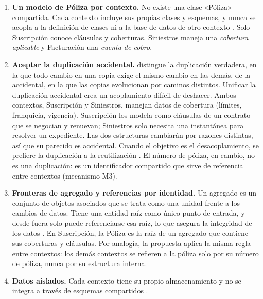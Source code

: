 \begin{enumerate}[label=\textbf{M\arabic*.}, leftmargin=2.2em]
  \item \textbf{Un modelo de Póliza por contexto.} No existe una clase «Póliza»
        compartida. Cada contexto incluye sus propias clases y esquemas, y nunca se acopla
        a la definición de clases ni a la base de datos de otro contexto
        \parencite[cap.~17]{richardsford2020}. Solo Suscripción conoce cláusulas y
        coberturas. Siniestros maneja una \emph{cobertura aplicable} y Facturación una
        \emph{cuenta de cobro}.

  \item \textbf{Aceptar la duplicación accidental.} \textcite[154--155]{martin2017}
        distingue la duplicación verdadera, en la que todo cambio en una copia exige el
        mismo cambio en las demás, de la accidental, en la que las copias evolucionan por
        caminos distintos. Unificar la duplicación accidental crea un acoplamiento difícil
        de deshacer. Ambos contextos, Suscripción y Siniestros, manejan datos de
        cobertura (límites, franquicia, vigencia). Suscripción los modela como cláusulas
        de un contrato que se negocian y renuevan; Siniestros solo necesita una
        instantánea para resolver un expediente. Las dos estructuras cambiarán por
        razones distintas, así que su parecido es accidental. Cuando el objetivo es el
        desacoplamiento, se prefiere la duplicación a la reutilización
        \parencite[cap.~17]{richardsford2020}. El número de póliza, en cambio, no es una
        duplicación: es un identificador compartido que sirve de referencia entre
        contextos (mecanismo M3).

  \item \textbf{Fronteras de agregado y referencias por identidad.} Un agregado es un
        conjunto de objetos asociados que se trata como una unidad frente a los cambios
        de datos. Tiene una entidad raíz como único punto de entrada, y desde fuera solo
        puede referenciarse esa raíz, lo que asegura la integridad de los datos
        \parencite[172]{delatorre2010}. En Suscripción, la Póliza es la raíz de un
        agregado que contiene sus coberturas y cláusulas. Por analogía, la propuesta
        aplica la misma regla entre contextos: los demás contextos se refieren a la póliza
        solo por su número de póliza, nunca por su estructura interna.

  \item \textbf{Datos aislados.} Cada contexto tiene su propio almacenamiento y no se
        integra a través de esquemas compartidos \parencite[cap.~17]{richardsford2020}.


\end{enumerate}
